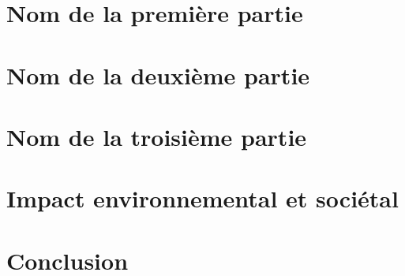 \documentclass[12pt,a4paper]{report}
\begin{document}
% 

\chapter{Nom de la première partie}


\chapter{Nom de la deuxième partie}


\chapter{Nom de la troisième partie}


\chapter{Impact environnemental et sociétal}


\chapter*{Conclusion}


\printbibliography %

\begin{appendix}
\end{appendix}

\end{document}
